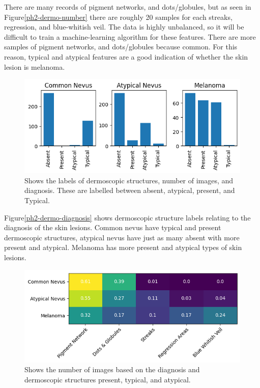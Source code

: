 There are many records of pigment networks, and dots/globules, but as seen in Figure\ref{ph2-dermo-number} there are roughly 20 samples for each streaks, regression, and blue-whitish veil. The data is highly unbalanced, so it will be difficult to train a machine-learning algorithm for these features. There are more samples of pigment networks, and dots/globules because common. For this reason, typical and atypical features are a good indication of whether the skin lesion is melanoma.

\begin{figure}
    \centering
    \includegraphics[scale=0.75]{images/ph2/ph2-dermo-diagnosis.png}
    \caption{Shows the labels of dermoscopic structures, number of images, and diagnosis. These are labelled between absent, atypical, present, and Typical.} 
\end{figure}\label{ph2-dermo-diagnosis}

Figure\ref{ph2-dermo-diagnosis} shows dermoscopic structure labels relating to the diagnosis of the skin lesions. Common nevus have typical and present dermoscopic structures, atypical nevus have just as many absent with more present and atypical. Melanoma has more present and atypical types of skin lesions. 

\begin{figure}
    \centering
    \includegraphics[scale=0.75]{images/ph2/ph2-diagnosis-dermo-heat.png}
    \caption{Shows the number of images based on the diagnosis and dermoscopic structures present, typical, and atypical.} 
\end{figure}\label{ph2-diagnosis-dermo}

